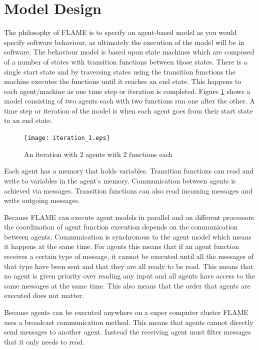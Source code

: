 \section{Model Design}
\label{sec:model_design}

The philosophy of FLAME is to specify an agent-based model as you would specify
software behaviour, as ultimately the execution of the model will be in software.
The behaviour model is based upon state machines which are composed of a number
of states with transition functions between those states. There is a single
start state and by traversing states using the transition functions the machine
executes the functions until it reaches an end state. This happens to each
agent/machine as one time step or iteration is completed. Figure
\ref{fig:iteration_1} shows a model consisting of two agents each with two
functions run one after the other. A time step or iteration of the model is when
each agent goes from their start state to an end state.

\begin{figure}[ht]
\begin{center}
\texttt{[image: iteration\_1.eps]}
\caption{An iteration with 2 agents with 2 functions each}
\label{fig:iteration_1}
\end{center}
\end{figure}

Each agent has a memory that holds variables. Transition functions can read and
write to variables in the agent's memory. Communication between agents is
achieved via messages. Transition functions can also read incoming messages and write
outgoing messages. 

Because FLAME can execute agent models in parallel and on different processors
the coordination of agent function execution depends on the communication
between agents. Communication is synchronous to the agent model which means it
happens at the same time. For agents this means that if an agent function
receives a certain type of message, it cannot be executed until all the messages
of that type have been sent and that they are all ready to be read. This means
that no agent is given priority over reading any input and all agents have
access to the same messages at the same time. This also means that the order
that agents are executed does not matter.

Because agents can be executed anywhere on a super computer cluster FLAME uses a
broadcast communication method. This means that agents cannot directly send
messages to another agent. Instead the receiving agent must filter messages that
it only needs to read.


